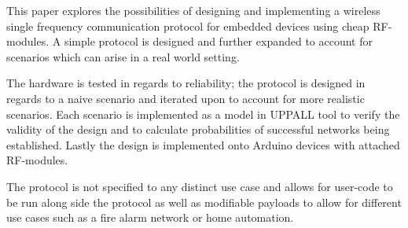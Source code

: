 This paper explores the possibilities of designing and implementing a wireless single frequency communication protocol for embedded devices using cheap RF-modules.
A simple protocol is designed and further expanded to account for scenarios which can arise in a real world setting.

\medskip
The hardware is tested in regards to reliability; the protocol is designed in regards to a naive scenario and iterated upon to account for more realistic scenarios.
Each scenario is implemented as a model in UPPALL tool to verify the validity of the design and to calculate probabilities of successful networks being established.
Lastly the design is implemented onto Arduino devices with attached RF-modules.

\medskip
The protocol is not specified to any distinct use case and allows for user-code to be run along side the protocol as well as modifiable payloads to allow for different use cases such as a fire alarm network or home automation. 